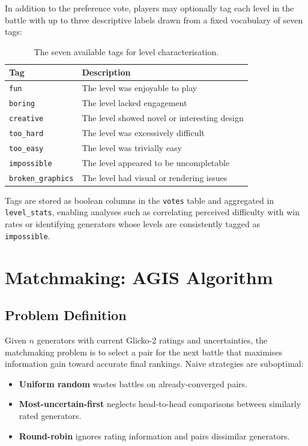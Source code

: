 \documentclass[shortabstract, mgr, english]{iithesis}
\begin{document}
In addition to the preference vote, players may optionally tag each level in the battle
with up to three descriptive labels drawn from a fixed vocabulary of seven tags:

\begin{table}[H]
\centering
\begin{tabular}{ll}
\toprule
\textbf{Tag} & \textbf{Description} \\
\midrule
\texttt{fun}              & The level was enjoyable to play \\
\texttt{boring}           & The level lacked engagement \\
\texttt{creative}         & The level showed novel or interesting design \\
\texttt{too\_hard}        & The level was excessively difficult \\
\texttt{too\_easy}        & The level was trivially easy \\
\texttt{impossible}       & The level appeared to be uncompletable \\
\texttt{broken\_graphics} & The level had visual or rendering issues \\
\bottomrule
\end{tabular}
\caption{The seven available tags for level characterisation.}
\label{tab:tags}
\end{table}

Tags are stored as boolean columns in the \texttt{votes} table and aggregated in
\texttt{level\_stats}, enabling analyses such as correlating perceived difficulty with
win rates or identifying generators whose levels are consistently tagged as
\texttt{impossible}.

\section{Matchmaking: AGIS Algorithm}
\label{sec:sd-matchmaking}

\subsection{Problem Definition}
\label{subsec:sd-matchmaking-problem}

Given $n$ generators with current Glicko-2 ratings and uncertainties, the matchmaking
problem is to select a pair for the next battle that maximises information gain toward
accurate final rankings. Naive strategies are suboptimal:

\begin{itemize}
    \item \textbf{Uniform random} wastes battles on already-converged pairs.
    \item \textbf{Most-uncertain-first} neglects head-to-head comparisons between
          similarly rated generators.
    \item \textbf{Round-robin} ignores rating information and pairs dissimilar generators.
\end{itemize}
\end{document}
